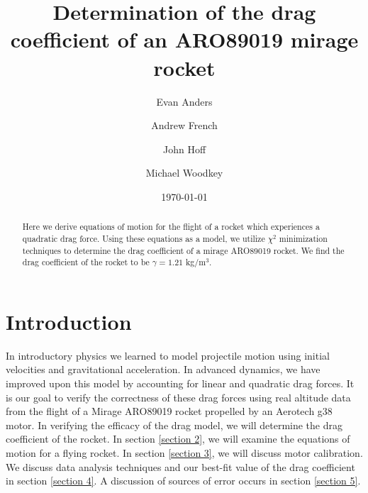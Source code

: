 \documentclass[aps,pra,twocolumn]{revtex4-1}
\begin{document}
\title{Determination of the drag coefficient of an ARO89019 mirage rocket}

\author{Evan Anders}
\author{Andrew French}
\author{John Hoff}
\author{Michael Woodkey}


\date{\today}

\begin{abstract}
Here we derive equations of motion for the flight of a rocket which experiences a quadratic drag force.  Using these equations as a model, we utilize $\chi^2$ minimization techniques to determine the drag coefficient of a mirage ARO89019 rocket.  We find the drag coefficient of the rocket to be $\gamma = 1.21$ kg/m$^3$.
\end{abstract}



\maketitle


\section{\label{section1} Introduction}
In introductory physics we learned to model projectile motion using initial velocities and gravitational acceleration.  In advanced dynamics, we have improved upon this model by accounting for linear and quadratic drag forces.  It is our goal to verify the correctness of these drag forces using real altitude data from the flight of a Mirage ARO89019 rocket propelled by an Aerotech g38 motor.  In verifying the efficacy of the drag model, we will determine the drag coefficient of the rocket.  In section \ref{section 2}, we will examine the equations of motion for a flying rocket.  In section \ref{section 3}, we will discuss motor calibration.  We discuss data analysis techniques and our best-fit value of the drag coefficient in section \ref{section 4}.  A discussion of sources of error occurs in section \ref{section 5}.
\end{document}
